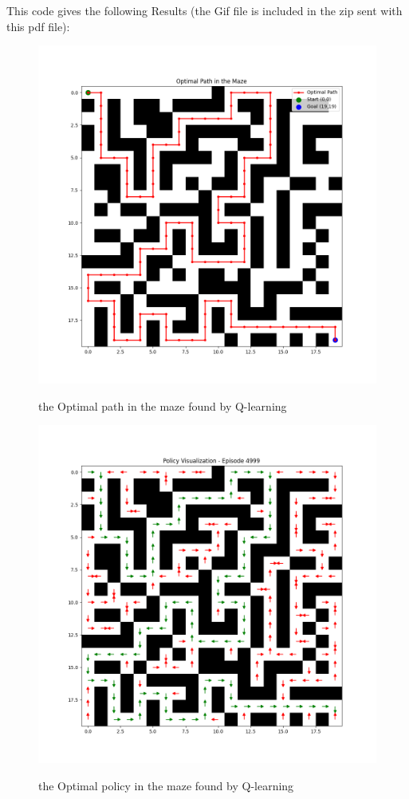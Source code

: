 \documentclass[11pt]{article}
\begin{document}
This code gives the following Results (the Gif file is included in the zip sent with this pdf file):
\begin{figure}[H]
    \begin{center}
        \includegraphics[scale=0.55]{Fig/optimal_path.png}
        \label{fig:optimalPath}
        \caption{the Optimal path in the maze found by Q-learning}
    \end{center}
\end{figure}

\begin{figure}[H]
    \begin{center}
        \includegraphics[scale=0.55]{Fig/optimal_policy.png}
        \label{fig:optimalPath}
        \caption{the Optimal policy in the maze found by Q-learning}
    \end{center}
\end{figure}
\end{document}
